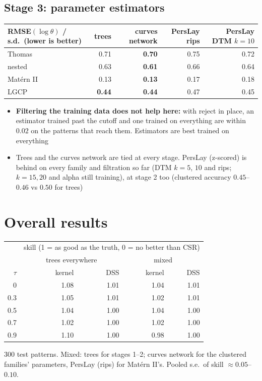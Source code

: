 \documentclass[11pt]{article}
\begin{document}
\subsection*{Stage 3: parameter estimators}
\begin{center}
\begin{tabular}{@{}lrrrr@{}}
\toprule
RMSE$(\log\theta)$ / s.d.\ (lower is better) & trees & curves network & PersLay rips & PersLay DTM $k{=}10$ \\
\midrule
Thomas      & 0.71 & \textbf{0.70} & 0.75 & 0.72 \\
nested      & 0.63 & \textbf{0.61} & 0.66 & 0.64 \\
Mat\'ern II & 0.13 & \textbf{0.13} & 0.17 & 0.18 \\
LGCP        & \textbf{0.44} & \textbf{0.44} & 0.47 & 0.45 \\
\bottomrule
\end{tabular}
\end{center}
\begin{itemize}
  \item \textbf{Filtering the training data does not help here:} with reject in place, an estimator trained past the cutoff and one trained on everything are within $0.02$ on the patterns that reach them. Estimators are best trained on everything
  \item Trees and the curves network are tied at every stage. PersLay (z-scored) is behind on every family and filtration so far (DTM $k{=}5$, $10$ and rips; $k{=}15, 20$ and alpha still training), at stage 2 too (clustered accuracy $0.45$--$0.46$ vs $0.50$ for trees)
\end{itemize}

\section{Overall results}

\begin{center}
\begin{tabular}{@{}rrrrr@{}}
\toprule
& \multicolumn{4}{c}{skill (1 = as good as the truth, 0 = no better than CSR)} \\
& \multicolumn{2}{c}{trees everywhere} & \multicolumn{2}{c}{mixed} \\
$\tau$ & kernel & DSS & kernel & DSS \\
\midrule
0   & 1.08 & 1.01 & 1.04 & 1.01 \\
0.3 & 1.05 & 1.01 & 1.02 & 1.01 \\
0.5 & 1.04 & 1.00 & 1.04 & 1.00 \\
0.7 & 1.02 & 1.00 & 1.02 & 1.00 \\
0.9 & 1.10 & 1.00 & 0.98 & 1.00 \\
\bottomrule
\end{tabular}
\end{center}
{\small 300 test patterns. Mixed: trees for stages 1--2; curves network for the clustered families' parameters, PersLay (rips) for Mat\'ern II's. Pooled s.e.\ of skill $\approx0.05$--$0.10$.}
\end{document}
